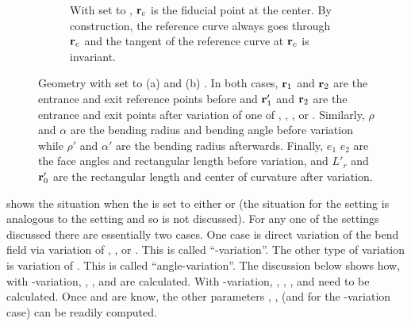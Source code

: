 \begin{figure}[tb]
\begin{subfigure}[b]{0.4\textwidth}
    \caption{
With  set to , ${\bf r}_c$ is the fiducial point at the center. By
construction, the reference curve always goes through ${\bf r}_c$ and the tangent of the reference
curve at ${\bf r}_c$ is invariant.}
    \label{f:bend.fid2}
  \end{subfigure}
  \hfill
  \caption{
Geometry with  set to (a)  and (b) . In both cases,
${\bf r}_1$ and ${\bf r}_2$ are the entrance and exit reference points before and ${\bf r}'_1$ and ${\bf r}_2$
are the entrance and exit points after variation of one of , , , or
.  Similarly, $\rho$ and $\alpha$ are the bending radius and bending angle before
variation while $\rho'$ and $\alpha'$ are the bending radius afterwards.  Finally, $e_1$ $e_2$
are the face angles and rectangular length before variation, and $L'_r$ and ${\bf r}'_0$ are the
rectangular length and center of curvature after variation.
  }
  \label{f:bend.fid}
\end{figure}

 shows the situation when the  is set to either  or
 (the situation for the  setting is analogous to the 
setting and so is not discussed). For any one of the  settings discussed there are
essentially two cases. One case is direct variation of the bend field via variation of ,
, or . This is called ``-variation''. The other type of variation is
variation of . This is called ``angle-variation''. The discussion below shows how, with
-variation, , , and  are calculated. With -variation, ,
, , and  need to be calculated. Once  and  are know, the other
parameters , ,  (and  for the -variation
case) can be readily computed.

